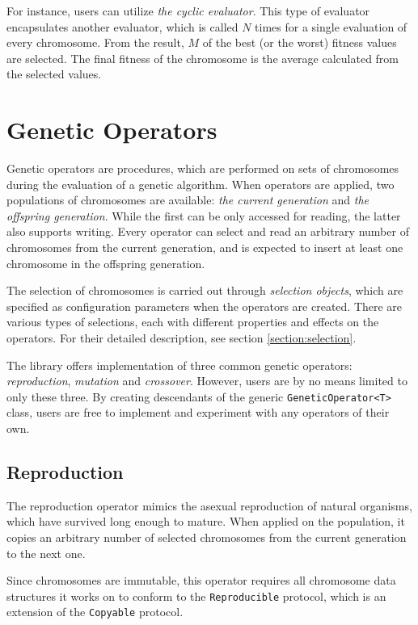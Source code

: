 For instance, users can utilize \textit{the cyclic evaluator}. This type of evaluator encapsulates another evaluator, which is called $N$ times for a single evaluation of every chromosome. From the result, $M$ of the best (or the worst) fitness values are selected. The final fitness of the chromosome is the average calculated from the selected values.

\section{Genetic Operators}\label{section:genetic-operators}
Genetic operators are procedures, which are performed on sets of chromosomes during the evaluation of a genetic algorithm. When operators are applied, two populations of chromosomes are available: \textit{the current generation} and \textit{the offspring generation}. While the first can be only accessed for reading, the latter also supports writing. Every operator can select and read an arbitrary number of chromosomes from the current generation, and is expected to insert at least one chromosome in the offspring generation.

The selection of chromosomes is carried out through \textit{selection objects}, which are specified as configuration parameters when the operators are created. There are various types of selections, each with different properties and effects on the operators. For their detailed description, see section \ref{section:selection}.

The library offers implementation of three common genetic operators: \textit{reproduction}, \textit{mutation} and \textit{crossover}. However, users are by no means limited to only these three. By creating descendants of the generic \texttt{GeneticOperator<T>} class, users are free to implement and experiment with any operators of their own.

\subsection{Reproduction}\label{section:reproduction}
The reproduction operator mimics the asexual reproduction of natural organisms, which have survived long enough to mature. When applied on the population, it copies an arbitrary number of selected chromosomes from the current generation to the next one.

Since chromosomes are immutable, this operator requires all chromosome data structures it works on to conform to the \texttt{Reproducible} protocol, which is an extension of the \texttt{Copyable} protocol.

